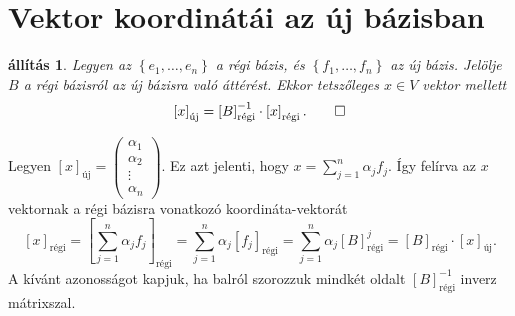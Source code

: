\documentclass[a4paper, showtrims]{memoir}
\makeatletter
\renewenvironment{proof}[1][\proofname]
    {\par\pushQED{\qed}%
    \normalfont \topsep6\p@\@plus6\p@\relax
    \trivlist
    \item[\hskip\labelsep
        \itshape
    #1\@addpunct{:}]\ignorespaces}
    {\popQED\endtrivlist\@endpefalse}
\theoremstyle{plain}
\newtheorem{proposition}{állítás}[chapter]
\theoremstyle{remark}
\theoremstyle{definition}
\newcommand{\uj}{\text{új}}
\newcommand{\rgi}{\text{régi}}
\makeatother
\begin{document}
\section{Vektor koordinátái az új bázisban}
\begin{proposition}
	Legyen az $\left\{ e_1,\ldots,e_n \right\}$ a régi bázis,
	és $\left\{ f_1,\ldots,f_n \right\}$ az új bázis.
	Jelölje $B$ a régi bázisról az új bázisra való áttérést.
	Ekkor tetszőleges $x\in V$ vektor mellett
	\[
		\left[ x \right]_\uj
		=
		\left[ B \right]_\rgi^{-1}
		\cdot
		\left[ x \right]_\rgi.\qedhere
	\]
\end{proposition}
\begin{proof}
	Legyen
	$
		\left[ x \right]_\uj
		=
		\begin{pmatrix}
			\alpha_1 \\ \alpha_2 \\ \vdots \\ \alpha_n
		\end{pmatrix}.
	$
	Ez azt jelenti, hogy $x=\sum_{j=1}^n\alpha_jf_j$.
	Így felírva az $x$ vektornak a régi bázisra vonatkozó koordináta-vektorát
	\[
		\left[ x \right]_\rgi
		=\left[ \sum_{j=1}^n\alpha_jf_j \right]_\rgi
		=\sum_{j=1}^n\alpha_j\left[ f_j \right]_\rgi
		=\sum_{j=1}^n\alpha_j\left[ B \right]_\rgi^j
		=\left[ B \right]_\rgi\cdot \left[ x \right]_\uj.
	\]
	A kívánt azonosságot kapjuk,
	ha balról szorozzuk mindkét oldalt $\left[ B \right]^{-1}_\rgi$ inverz mátrixszal.
\end{proof}
\end{document}
